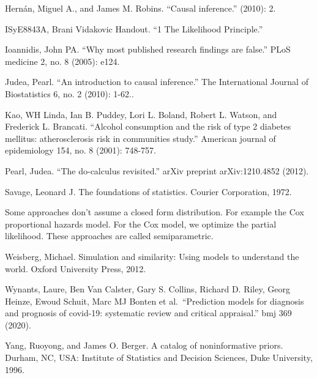\documentclass[
  10pt,
]{scrbook}
\begin{document}
Hernán, Miguel A., and James M. Robins. ``Causal inference.'' (2010): 2.

ISyE8843A, Brani Vidakovic Handout. ``1 The Likelihood Principle.''

Ioannidis, John PA. ``Why most published research findings are false.'' PLoS medicine 2, no. 8 (2005): e124.

Judea, Pearl. ``An introduction to causal inference.'' The International Journal of Biostatistics 6, no. 2 (2010): 1-62..

Kao, WH Linda, Ian B. Puddey, Lori L. Boland, Robert L. Watson, and Frederick L. Brancati. ``Alcohol consumption and the risk of type 2 diabetes mellitus: atherosclerosis risk in communities study.'' American journal of epidemiology 154, no. 8 (2001): 748-757.

Pearl, Judea. ``The do-calculus revisited.'' arXiv preprint arXiv:1210.4852 (2012).

Savage, Leonard J. The foundations of statistics. Courier Corporation, 1972.

Some approaches don't assume a closed form distribution. For example the Cox proportional hazards model. For the Cox model, we optimize the partial likelihood. These approaches are called semiparametric.

Weisberg, Michael. Simulation and similarity: Using models to understand the world. Oxford University Press, 2012.

Wynants, Laure, Ben Van Calster, Gary S. Collins, Richard D. Riley, Georg Heinze, Ewoud Schuit, Marc MJ Bonten et al.~``Prediction models for diagnosis and prognosis of covid-19: systematic review and critical appraisal.'' bmj 369 (2020).

Yang, Ruoyong, and James O. Berger. A catalog of noninformative priors. Durham, NC, USA: Institute of Statistics and Decision Sciences, Duke University, 1996.

\printindex
\thispagestyle{empty}
\end{document}
